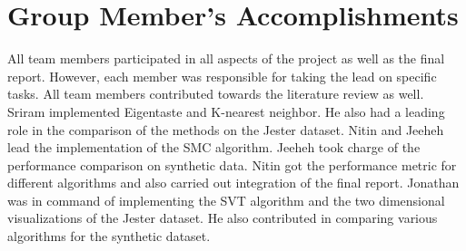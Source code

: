 \documentclass{article} %
\begin{document}
\section{Group Member's Accomplishments}

All team members participated in all aspects of the project as well as
the final report. However, each member was responsible for taking the
lead on specific tasks. All team members contributed towards the
literature review as well. Sriram implemented Eigentaste and K-nearest
neighbor. He also had a leading role in the comparison of the methods
on the Jester dataset. Nitin and Jeeheh lead the implementation of the
SMC algorithm. Jeeheh took charge of the performance comparison on
synthetic data. Nitin got the performance metric for different
algorithms and also carried out integration of the final report.
Jonathan was in command of implementing the SVT algorithm and the two
dimensional visualizations of the Jester dataset. He also contributed
in comparing various algorithms for the synthetic dataset.





\newpage
\end{document}
